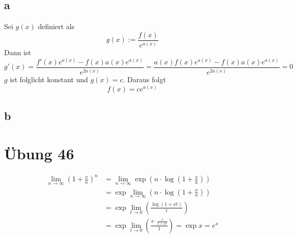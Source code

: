 \documentclass[a4paper,10pt]{article}
\begin{document}
\subsection*{a}

Sei $g(x)$ definiert als
\begin{equation}
 g(x) := \frac{f(x)}{e^{a(x)}}
\end{equation}
Dann ist
\begin{equation}
 g'(x) = \frac{f'(x)e^{a(x)} - f(x)a(x)e^{a(x)}}{e^{2a(x)}} = \frac{a(x)f(x)e^{a(x)} - f(x)a(x)e^{a(x)}}{e^{2a(x)}} = 0
\end{equation}
$g$ ist folglicht konstant und $g(x) = c$. Daraus folgt
\begin{equation}
 f(x) = c e^{a(x)}
\end{equation}


\subsection*{b}

\section*{Übung 46}

\begin{align*}
 \lim_{n \rightarrow \infty} \left( 1 + \frac{x}{n} \right)^n & = \lim_{n \rightarrow \infty} \exp \left( n \cdot \log \left( 1 + \frac{x}{n} \right) \right)\\
 & = \exp \lim_{n \rightarrow \infty} \left( n \cdot \log \left( 1 + \frac{x}{n} \right) \right)\\
 & = \exp \lim_{t \rightarrow 0} \left( \frac{\log \left( 1 + xt \right)}{t} \right)\\
 & = \exp \lim_{t \rightarrow 0} \left( \frac{x \cdot \frac{1}{1 + xt}}{1} \right) = \exp x = e^x\\
\end{align*}
\end{document}
